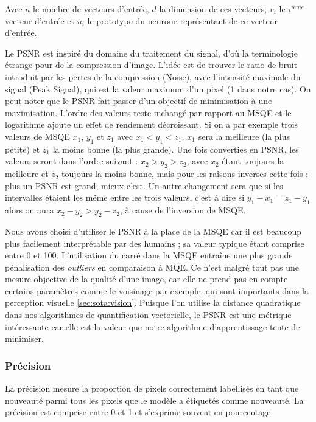 	Avec $n$ le nombre de vecteurs d'entrée, $d$ la dimension de ces vecteurs, $v_i$ le $i^{\textit{ième}}$ vecteur d'entrée et $u_i$ le prototype du neurone représentant de ce vecteur d'entrée.

	Le PSNR est inspiré du domaine du traitement du signal, d'où la terminologie étrange pour de la compression d'image. L'idée est de trouver le ratio de bruit introduit par les pertes de la compression (Noise), avec l'intensité maximale du signal (Peak Signal), qui est la valeur maximum d'un pixel (1 dans notre cas). On peut noter que le PSNR fait passer d'un objectif de minimisation à une maximisation. L'ordre des valeurs reste inchangé par rapport au MSQE et le logarithme ajoute un effet de rendement décroissant. Si on a par exemple trois valeurs de MSQE $x_1$, $y_1$ et $z_1$ avec $x_1 < y_1 < z_1$. $x_1$ sera la meilleure (la plus petite) et $z_1$ la moins bonne (la plus grande). Une fois converties en PSNR, les valeurs seront dans l'ordre suivant : $x_2 > y_2 > z_2$, avec $x_2$ étant toujours la meilleure et $z_2$ toujours la moins bonne, mais pour les raisons inverses cette fois : plus un PSNR est grand, mieux c'est. Un autre changement sera que si les intervalles étaient les même entre les trois valeurs, c'est à dire si $y_1 - x_1 = z_1 - y_1$ alors on aura $x_2 - y_2 > y_2 - z_2$, à cause de l'inversion de MSQE.

	Nous avons choisi d'utiliser le PSNR à la place de la MSQE car il est beaucoup plus facilement interprétable par des humains ; sa valeur typique étant comprise entre 0 et 100. L'utilisation du carré dans la MSQE entraîne une plus grande pénalisation des \textit{outliers} en comparaison à MQE. Ce n'est malgré tout pas une mesure objective de la qualité d'une image, car elle ne prend pas en compte certains paramètres comme le voisinage par exemple, qui sont importants dans la perception visuelle \ref{sec:sota:vision}. Puisque l'on utilise la distance quadratique dans nos algorithmes de quantification vectorielle, le PSNR est une métrique intéressante car elle est la valeur que notre algorithme d'apprentissage tente de minimiser.
	
	\subsubsection{Précision}

	La précision mesure la proportion de pixels correctement labellisés en tant que nouveauté parmi tous les pixels que le modèle a étiquetés comme nouveauté. La précision est comprise entre 0 et 1 et s'exprime souvent en pourcentage.
	
